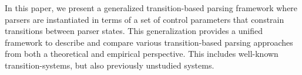 In this paper, we present a generalized transition-based parsing framework where parsers are instantiated in terms of a set of control parameters that constrain transitions between parser states. This generalization provides a unified framework to describe and compare various transition-based parsing approaches from both a theoretical and empirical perspective. This includes well-known transition-systems, but also previously unstudied systems.
